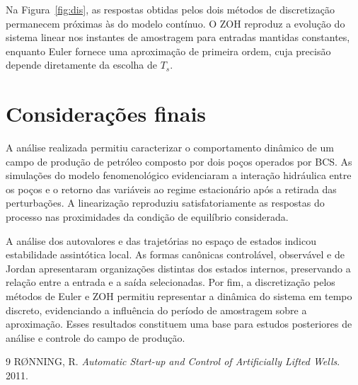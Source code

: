 \documentclass[10pt,a4paper]{article}
\begin{document}
Na Figura~\ref{fig:dis}, as respostas obtidas pelos dois métodos de discretização permanecem próximas às do modelo contínuo. O ZOH reproduz a evolução do sistema linear nos instantes de amostragem para entradas mantidas constantes, enquanto Euler fornece uma aproximação de primeira ordem, cuja precisão depende diretamente da escolha de $T_s$.

\section{Considerações finais}
A análise realizada permitiu caracterizar o comportamento dinâmico de um campo de produção de petróleo composto por dois poços operados por BCS. As simulações do modelo fenomenológico evidenciaram a interação hidráulica entre os poços e o retorno das variáveis ao regime estacionário após a retirada das perturbações. A linearização reproduziu satisfatoriamente as respostas do processo nas proximidades da condição de equilíbrio considerada.

A análise dos autovalores e das trajetórias no espaço de estados indicou estabilidade assintótica local. As formas canônicas controlável, observável e de Jordan apresentaram organizações distintas dos estados internos, preservando a relação entre a entrada e a saída selecionadas. Por fim, a discretização pelos métodos de Euler e ZOH permitiu representar a dinâmica do sistema em tempo discreto, evidenciando a influência do período de amostragem sobre a aproximação. Esses resultados constituem uma base para estudos posteriores de análise e controle do campo de produção.

\begin{thebibliography}{9}
 RØNNING, R. \textit{Automatic Start-up and Control of Artificially Lifted Wells}. 2011.
\end{thebibliography}
\end{document}
